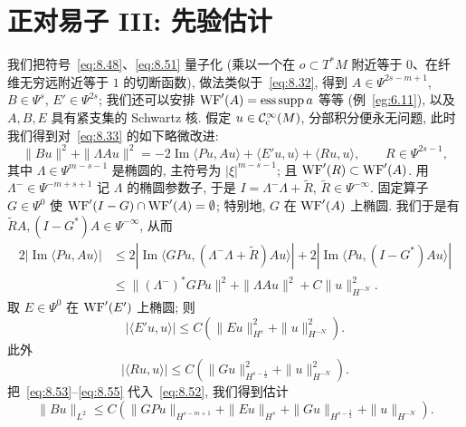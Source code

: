 \section{正对易子 III: 先验估计}\label{sec:8.4}

我们把符号~\eqref{eq:8.48}、\eqref{eq:8.51} 量子化 (乘以一个在 $o \subset T^*M$ 附近等于 $0$、在纤维无穷远附近等于 $1$ 的切断函数), 做法类似于~\eqref{eq:8.32}, 得到 $A \in \Psi^{2s-m+1}$, $B \in \Psi^s$, $E' \in \Psi^{2s}$; 我们还可以安排 $\operatorname{WF}'(A) = \operatorname{ess\,supp} a$ 等等 (例~\ref{eg:6.11}), 以及 $A, B, E$ 具有紧支集的 Schwartz 核. 假定 $u \in \mathcal{C}_{\mathrm{c}}^\infty(M)$, 分部积分便永无问题, 此时我们得到对~\eqref{eq:8.33} 的如下略微改进:
\begin{equation}\label{eq:8.52}
    \| B u \|^2 + \| \Lambda A u \|^2 = -2 \operatorname{Im} \langle P u, A u \rangle + \langle E' u, u \rangle + \langle R u, u \rangle, \qquad R \in \Psi^{2s-1},
\end{equation}
其中 $\Lambda \in \Psi^{m-s-1}$ 是椭圆的, 主符号为 $| \xi |^{m-s-1}$; 且 $\operatorname{WF}'(R) \subset \operatorname{WF}'(A)$. 用 $\Lambda^- \in \Psi^{-m+s+1}$ 记 $\Lambda$ 的椭圆参数子, 于是 $I = \Lambda^-\Lambda + \tilde{R}$, $\tilde{R} \in \Psi^{-\infty}$. 固定算子 $G \in \Psi^0$ 使 $\operatorname{WF}'(I - G) \cap \operatorname{WF}'(A) = \emptyset$; 特别地, $G$ 在 $\operatorname{WF}'(A)$ 上椭圆. 我们于是有 $\tilde{R}A, (I - G^*)A \in \Psi^{-\infty}$, 从而
\begin{equation}\label{eq:8.53}
    \begin{aligned}
        2| \operatorname{Im} \langle P u, A u \rangle |
        &\le 2| \operatorname{Im} \langle G P u, (\Lambda^-\Lambda + \tilde{R})A u \rangle | + 2| \operatorname{Im} \langle P u, (I - G^*)A u \rangle | \\
        &\le \| (\Lambda^-)^* G P u \|^2 + \| \Lambda A u \|^2 + C \| u \|_{H^{-N}}^2.
    \end{aligned}
\end{equation}
取 $E \in \Psi^0$ 在 $\operatorname{WF}'(E')$ 上椭圆; 则
\begin{equation}\label{eq:8.54}
    | \langle E' u, u \rangle | \le C\left( \| E u \|_{H^s}^2 + \| u \|_{H^{-N}}^2 \right).
\end{equation}
此外
\begin{equation}\label{eq:8.55}
    | \langle R u, u \rangle | \le C\left( \| G u \|_{H^{s-\frac{1}{2}}}^2 + \| u \|_{H^{-N}}^2 \right).
\end{equation}
把~\eqref{eq:8.53}--\eqref{eq:8.55} 代入~\eqref{eq:8.52}, 我们得到估计
\begin{equation}\label{eq:8.56}
    \| B u \|_{L^2} \le C\left( \| G P u \|_{H^{s-m+1}} + \| E u \|_{H^s} + \| G u \|_{H^{s-\frac{1}{2}}} + \| u \|_{H^{-N}} \right).
\end{equation}
